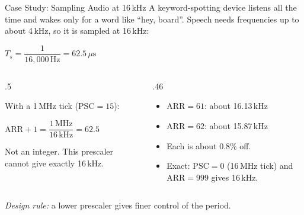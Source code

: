 \documentclass[9pt,aspectratio=169,xcolor=table]{beamer}
\begin{document}
\begin{frame}{Case Study: Sampling Audio at 16\,kHz}
    \leavevmode
    A keyword-spotting device listens all the time and wakes only for a word like ``hey, board''. Speech needs frequencies up to about 4\,kHz, so it is sampled at \alert{16\,kHz}:

    \vspace{1mm}
    \begin{center}
    $T_s = \dfrac{1}{16{,}000\,\text{Hz}} = 62.5\,\mu\text{s}$
    \end{center}

    \vspace{1mm}
    \begin{columns}[T]
    \begin{column}{.5\textwidth}
        {\small With a 1\,MHz tick ($\text{PSC}=15$):

        $\text{ARR}+1 = \dfrac{1\,\text{MHz}}{16\,\text{kHz}} = 62.5$

        \vspace{1mm}
        Not an integer. This prescaler \alert{cannot} give exactly 16\,kHz.}
    \end{column}
    \begin{column}{.46\textwidth}
        {\small
        \begin{itemize}\itemsep1pt
            \item $\text{ARR}=61$: about 16.13\,kHz
            \item $\text{ARR}=62$: about 15.87\,kHz
            \item Each is about 0.8\% off.
            \item \alert{Exact:} $\text{PSC}=0$ (16\,MHz tick) and $\text{ARR}=999$ gives 16\,kHz.
        \end{itemize}}
    \end{column}
    \end{columns}

    \vspace{2mm}
    {\small \emph{Design rule:} a lower prescaler gives finer control of the period.}
\end{frame}
\end{document}
